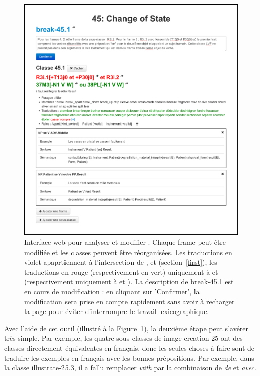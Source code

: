 \begin{figure}

    \includegraphics[width=\textwidth]{fig/tool_screenshot_2014-09-12.png}

    \caption{\label{tool}Interface web pour analyser et modifier \verbenet{}.
        Chaque frame peut être modifiée et les classes peuvent être
        réorganisées. Les traductions en violet apaprtiennent à l'intersection
        de \Clvf{}, \Clg{} et \Ltrad{} (section~\ref{first}), les traductions
        en rouge (respectivement en vert) uniquement à \Clvf{} et \Ltrad
        (respectivement uniquement à \Clg{} et \Ltrad{}). La description de
        {\color{blue}break-45.1} est en cours de modification : en cliquant sur
        'Confirmer', la modification sera prise en compte rapidement sans avoir
    à recharger la page pour éviter d'interrompre le travail lexicographique.}

\end{figure}

Avec l'aide de cet outil (illustré à la Figure~\ref{tool}), la deuxième étape
peut s'avérer très simple. Par exemple, les quatre sous-classes de
{\color{blue}image-creation-25} ont des classes directement équivalentes en
français, donc les seules choses à faire sont de traduire les exemples en
français avec les bonnes prépositions. Par exemple, dans la classe
{\color{blue}illustrate-25.3}, il a fallu remplacer \emph{with} par la
combinaison de \emph{de} et \emph{avec}.


